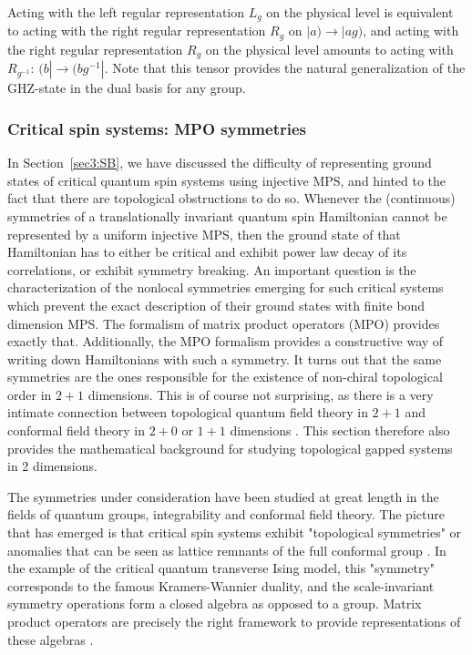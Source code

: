 \documentclass[rmp,aps,reprint,superscriptaddress,nobalancelastpage]{revtex4-1}
\begin{document}
Acting with the left regular representation $L_g$ on the physical level is equivalent to acting with the right regular representation $R_g$ on $|a)\rightarrow |ag)$, and acting with the right regular representation $R_g$ on the physical level amounts to acting with $R_{g^{-1}}$: $(b|\rightarrow (bg^{-1}|$. Note that this tensor provides the natural generalization of the GHZ-state in the dual basis for any group.




    \subsubsection{Critical spin systems:  MPO symmetries \label{CSS}}
    In Section~\ref{sec3:SB}, we have discussed the difficulty of representing ground states of critical quantum spin systems using injective MPS, and hinted to the fact that there are topological obstructions to do so. Whenever the (continuous) symmetries of a translationally invariant quantum spin Hamiltonian cannot be represented by a uniform injective MPS, then the ground state of that Hamiltonian has to either be critical and exhibit power law decay of its correlations, or exhibit symmetry breaking. An important question is the characterization of the nonlocal symmetries emerging for such  critical systems which prevent the exact description of their ground states with finite bond dimension MPS. The formalism of matrix product operators (MPO) provides exactly that. Additionally, the MPO formalism provides a constructive way of writing down Hamiltonians with such a symmetry. It turns out that the same symmetries are the ones responsible for the existence of non-chiral topological order in $2+1$ dimensions. This is of course not surprising, as there is a very intimate connection between topological quantum field theory in $2+1$ and conformal field theory in $2+0$ or $1+1$ dimensions \cite{witten1989quantum,elitzur1989remarks,fuchs2002tft,moore1989classical}. This section therefore also provides the mathematical background for studying topological gapped systems in 2 dimensions.

    The symmetries under consideration have been studied at great length in the fields of quantum groups, integrability and conformal field theory. The picture that has emerged is that critical spin systems exhibit "topological symmetries" or anomalies that can be seen as lattice remnants of the full conformal group \cite{aasen2016topological,vanhove2018mapping}. In the example of the critical quantum transverse Ising model,  this "symmetry" corresponds to the famous Kramers-Wannier duality, and the scale-invariant symmetry operations form a closed algebra as opposed to a group.  Matrix product operators are precisely the right framework to provide representations of these algebras \cite{sahinoglu:mpo-injectivity,bultinck:mpo-anyons,williamson:SET,lootens2020matrix,molnar:WHA}.
\end{document}
